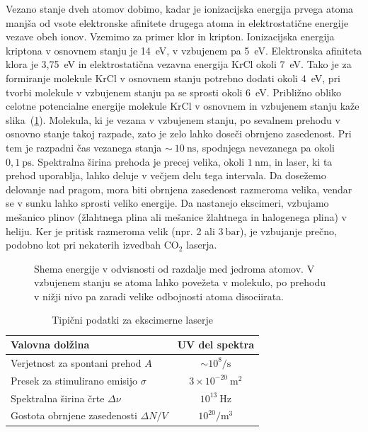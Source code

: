 Vezano stanje dveh atomov dobimo, kadar je ionizacijska energija prvega
atoma manjša od vsote elektronske afinitete drugega atoma in
elektrostatične energije vezave obeh ionov. Vzemimo za primer klor in
kripton. Ionizacijska energija kriptona v osnovnem stanju je 14~eV, v
vzbujenem pa 5~eV. Elektronska afiniteta klora je 3,75~eV in
elektrostatična vezavna energija KrCl okoli 7~eV. Tako je za formiranje
molekule KrCl v osnovnem stanju potrebno dodati okoli 4~eV, pri tvorbi
molekule v vzbujenem stanju pa se sprosti okoli 6~eV. Približno obliko
celotne potencialne energije molekule KrCl v osnovnem in vzbujenem stanju
kaže slika~(\ref{fig:exE}). Molekula, ki je vezana v vzbujenem stanju, po
sevalnem prehodu v osnovno stanje takoj razpade, zato je zelo lahko doseči
obrnjeno zasedenost. Pri tem je razpadni čas vezanega stanja $\sim~10~\si{\nano\second}$,
spodnjega nevezanega pa okoli $0,1~\si{\pico\second}$.
Spektralna širina prehoda je precej velika, okoli $1~\si{\nano\metre}$, in
laser, ki ta prehod uporablja, lahko deluje v večjem delu tega intervala.
Da dosežemo delovanje nad pragom, mora biti obrnjena zasedenost razmeroma velika,
vendar se v sunku lahko sprosti veliko energije. 
Da nastanejo ekscimeri, vzbujamo mešanico plinov (žlahtnega plina ali mešanice
žlahtnega in halogenega plina) v heliju. Ker je pritisk
razmeroma velik (npr. 2 ali $3~\si{\bar}$), je vzbujanje prečno, podobno kot pri 
nekaterih izvedbah CO$_2$ laserja.

\begin{figure}[h]
\centering
\def\svgwidth{50truemm} 

\caption{Shema energije v odvisnosti od razdalje med jedroma atomov. V vzbujenem stanju
se atoma lahko povežeta v molekulo, po prehodu v nižji nivo pa zaradi velike odbojnosti 
atoma disociirata.}
\label{fig:exE}
\end{figure}

\begin{table}[h]
\begin{center}
\begin{tabular}{|l|c|}\hline
Valovna dolžina  & UV del spektra\\ \hline
Verjetnost za spontani prehod $A$ & $\sim 10^8/\si{\second}$ \\ \hline
Presek za stimulirano emisijo $\sigma$ & $3 \times 10^{-20}~\si{\metre}^2$ \\ \hline
Spektralna širina črte $\Delta \nu$ & $10^{13}~\si{\hertz}$  \\ \hline
Gostota obrnjene zasedenosti $\Delta N/V$ & $10^{20}/\si{\metre}^3$ \\ \hline
\end{tabular}
\caption{Tipični podatki za ekscimerne laserje}
\label{tab:ex}
\end{center}
\end{table}

